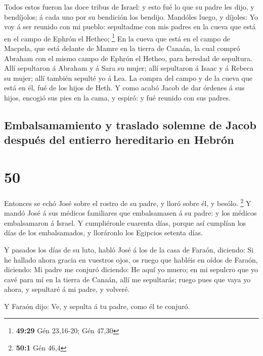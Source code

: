  Todos estos fueron las doce tribus de Israel: y esto fué
lo que su padre les dijo, y bendíjolos; á cada uno por su bendición los
bendijo.  Mandóles luego, y díjoles: Yo voy á ser reunido
con mi pueblo: sepultadme con mis padres en la cueva que está en el
campo de Ephrón el Hetheo; \footnote{\textbf{49:29} Gén 23,16-20; Gén
  47,30}  En la cueva que está en el campo de Macpela, que
está delante de Mamre en la tierra de Canaán, la cual compró Abraham con
el mismo campo de Ephrón el Hetheo, para heredad de sepultura.
 Allí sepultaron á Abraham y á Sara su mujer; allí
sepultaron á Isaac y á Rebeca su mujer; allí también sepulté yo á Lea.
 La compra del campo y de la cueva que está en él, fué de
los hijos de Heth.  Y como acabó Jacob de dar órdenes á sus
hijos, encogió sus pies en la cama, y espiró: y fué reunido con sus
padres.

\hypertarget{embalsamamiento-y-traslado-solemne-de-jacob-despuuxe9s-del-entierro-hereditario-en-hebruxf3n}{%
\subsection{Embalsamamiento y traslado solemne de Jacob después del
entierro hereditario en
Hebrón}\label{embalsamamiento-y-traslado-solemne-de-jacob-despuuxe9s-del-entierro-hereditario-en-hebruxf3n}}

\hypertarget{section-49}{%
\section{50}\label{section-49}}

 Entonces se echó José sobre el rostro de su padre, y lloró
sobre él, y besólo. \footnote{\textbf{50:1} Gén 46,4}  Y
mandó José á sus médicos familiares que embalsamasen á su padre: y los
médicos embalsamaron á Israel.  Y cumpliéronle cuarenta
días, porque así cumplían los días de los embalsamados, y lloráronlo los
Egipcios setenta días.

 Y pasados los días de su luto, habló José á los de la casa
de Faraón, diciendo: Si he hallado ahora gracia en vuestros ojos, os
ruego que habléis en oídos de Faraón, diciendo:  Mi padre me
conjuró diciendo: He aquí yo muero; en mi sepulcro que yo cavé para mí
en la tierra de Canaán, allí me sepultarás; ruego pues que vaya yo
ahora, y sepultaré á mi padre, y volveré.

 Y Faraón dijo: Ve, y sepulta á tu padre, como él te
conjuró.

